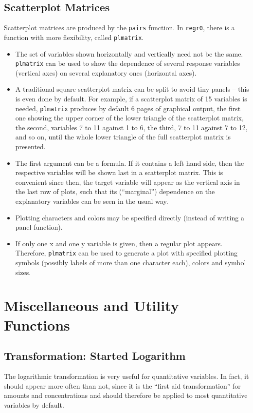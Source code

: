 \documentclass{article}
\providecommand{\T}{\texttt}
\providecommand{\Vneed}[1]{\penalty-5000\vskip#1%
\penalty-5000\vspace{-#1}}
\begin{document}
\subsection{Scatterplot Matrices}
Scatterplot matrices are produced by the \T{pairs} function.
In \T{regr0}, there is a function with more flexibility, called
\T{plmatrix}.
\begin{itemize}
\item 
  The set of variables shown horizontally and vertically need not be the
  same. \T{plmatrix} can be used to show the dependence of several 
  response variables (vertical axes) on several explanatory ones
  (horizontal axes).
\item
  A traditional square scatterplot matrix can be split to avoid
  tiny panels -- this is even done by default. For example, if 
  a scatterplot matrix of 15 variables is needed, 
  \T{plmatrix} produces by default 6 pages of graphical output,
  the first one showing the %
  upper corner of the lower triangle of the scatterplot matrix,
  the second, variables 7 to 11 against 1 to 6, the third, 
  7 to 11 against 7 to 12, and so on, until the whole lower triangle
  of the full scatterplot matrix is presented.
\item
  The first argument can be a formula. If it contains a left hand side,
  then the respective variables will be shown last in a scatterplot
  matrix. This is convenient since then, the target variable will appear as
  the vertical axis in the last row of plots, such that its (``marginal'')
  dependence on the explanatory variables can be seen in the usual way.
\item
  Plotting characters and colors may be specified directly (instead of 
  writing a panel function).
\item
  If only one x and one y variable is given, then a regular plot appears.
  Therefore, \T{plmatrix} can be used to generate a plot with specified
  plotting symbols (possibly labels of more than one character each),
  colors and symbol sizes.
\end{itemize}

\Vneed{50mm}
\section{Miscellaneous and Utility Functions}
\subsection{Transformation: Started Logarithm}
The logarithmic transformation is very useful for quantitative variables. 
In fact, it should appear more often than not, since it is the
``first aid transformation'' for amounts and concentrations and should
therefore be applied to most quantitative variables by default.
\end{document}
